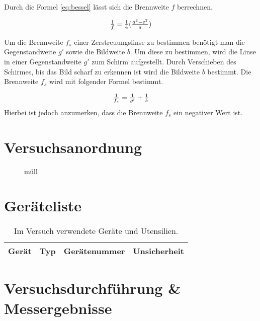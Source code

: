 \documentclass[12pt,a4paper,twoside]{article}
\begin{document}
\noindent
Durch die Formel \ref{eq:bessel} lässt sich die Brennweite $f$ berrechnen. 

\begin{equation}
    \label{eq:bessel}
    \centerline{$\frac{1}{f}=\frac{1}{4} (\frac{a^2 - e^2}{a})$}
\end{equation}

\noindent
Um die Brennweite $f_s$ einer Zerstreuungslinse zu bestimmen benötigt man die Gegenstandweite $g'$ sowie die Bildweite $b$. 
Um diese zu bestimmen, wird die Linse in einer Gegenstandweite $g'$ zum Schirm aufgestellt. Durch Verschieben des Schirmes, bis das Bild scharf zu erkennen ist wird die Bildweite $b$ bestimmt. Die Brennweite $f_s$ wird mit folgender Formel bestimmt. 

\begin{equation}
    \label{eq:Zerstreuungslinse}
    \centerline{$\frac{1}{f_s}=\frac{1}{g'} + \frac{1}{b}$}
\end{equation}
\noindent
Hierbei ist jedoch anzumerken, dass die Brennweite $f_s$ ein negativer Wert ist. 

\section{Versuchsanordnung} %

    \begin{figure}[H]
        \centering
        \caption{müll}
        \label{fig:müllbild}
    \end{figure}

\section{Geräteliste} %

    \begin{table}[H]
        \centering
        \caption{Im Versuch verwendete Geräte und Utensilien.}
        \label{tab:geraete}
        \begin{tabular}{| l | l | l | l |}
            \hline
            Gerät   & Typ   & Gerätenummer  & Unsicherheit \\
            \hline
        \end{tabular}
    \end{table}


\section{Versuchsdurchführung \& Messergebnisse} %
\end{document}
